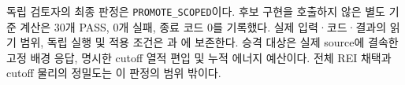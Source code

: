 독립 검토자의 최종 판정은 \texttt{PROMOTE\_SCOPED}이다. 후보 구현을 호출하지 않은 별도 기준 계산은 30개 PASS, 0개 실패, 종료 코드 0를 기록했다. 실제 입력·코드·결과의 읽기 범위, 독립 실행 및 적용 조건은 과 에 보존한다. 승격 대상은 실제 source에 결속한 고정 배경 응답, 명시한 cutoff 열적 편입 및 누적 에너지 예산이다. 전체 REI 채택과 cutoff 물리의 정밀도는 이 판정의 범위 밖이다.
